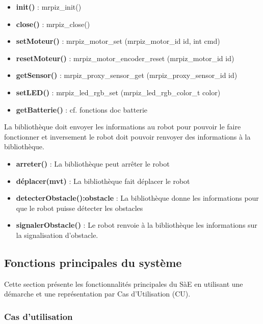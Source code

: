 \begin{itemize}
    \item \textbf{init()} : mrpiz\_init()
    \item \textbf{close()} : mrpiz\_close()
    \item \textbf{setMoteur()} : mrpiz\_motor\_set (mrpiz\_motor\_id id, int cmd)
    \item \textbf{resetMoteur()} : mrpiz\_motor\_encoder\_reset (mrpiz\_motor\_id id)
    \item \textbf{getSensor()} : mrpiz\_proxy\_sensor\_get (mrpiz\_proxy\_sensor\_id id)
    \item \textbf{setLED()} : mrpiz\_led\_rgb\_set (mrpiz\_led\_rgb\_color\_t color)
    \item \textbf{getBatterie()} : cf. fonctions doc batterie
\end{itemize}

La bibliothèque doit envoyer les informations au robot pour pouvoir le faire fonctionner et inversement le robot doit pouvoir renvoyer des informations à la bibliothèque.

\begin{itemize}
    \item \textbf{arreter()} : La bibliothèque peut arrêter le robot
    \item \textbf{déplacer(mvt)} : La bibliothèque fait déplacer le robot
    \item \textbf{detecterObstacle():obstacle} : La bibliothèque donne les informations pour que le robot puisse détecter les obstacles
    \item \textbf{signalerObstacle()} : Le robot renvoie à la bibliothèque les informations sur la signalisation d'obstacle.
\end{itemize}

\subsection{Fonctions principales du système}

Cette section présente les fonctionnalités principales du SàE en utilisant une démarche et une représentation par Cas d'Utilisation (CU).

\subsubsection{Cas d'utilisation}

